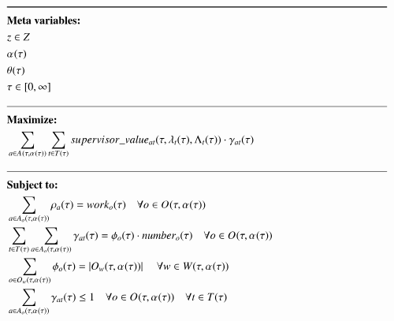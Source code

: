 \begin{alignat}{2}
	& \text{\rule{\linewidth}{0.8pt}} \notag \label{}                                                                                                                                                                                                                                                                                                                                                                     \\ 
	& \textbf{Meta variables:} \notag\\
	& \ElementSupervisor \in \SetSupervisor \\
	& \VarStrategicWorkOrderAssignment{}{} \\
	& \VarIncludeActivity{} \\
	& \tau \in [0, \infty] \\
	& \text{\rule{\linewidth}{0.4pt}} \notag\\
	& \textbf{Maximize:} \notag\\
	& \sum_{\ElementActivity \in \SetActivity{\VarStrategicWorkOrderAssignment{}{}}{}} \sum_{\ElementTechnician \in \SetTechnician} \ParSupervisorValue \cdot \VarSupervisorAssignment{\ElementActivity}{\ElementTechnician} \\ 
	& \text{\rule{\linewidth}{0.4pt}} \notag\\
	& \textbf{Subject to:} \notag\\ 
	& \sum_{\ElementActivity \in \SetActivity{\VarStrategicWorkOrderAssignment{}{}}{\ElementOperation}} \VarActivityWork{\ElementActivity} = \ParOperationWork{\ElementOperation}    \quad \forall \ElementOperation \in \SetOperation{}{\VarStrategicWorkOrderAssignment{}{}}\\
	& \sum_{\ElementTechnician \in \SetTechnician} \sum_{\ElementActivity \in \SetActivity{\VarStrategicWorkOrderAssignment{}{}}{\ElementOperation}}\VarSupervisorAssignment{\ElementActivity}{\ElementTechnician} = \VarSupervisorAssignmentWhole \cdot \ParNumberOfPeople  \quad \forall \ElementOperation \in \SetOperation{}{\VarStrategicWorkOrderAssignment{}{}}  \\
	& \sum_{\ElementOperation \in \SetOperation{\ElementWorkOrder}{\VarStrategicWorkOrderAssignment{}{}}} \VarSupervisorAssignmentWhole = |\SetOperation{\ElementWorkOrder}{\VarStrategicWorkOrderAssignment{}{}}| \ \quad \forall \ElementWorkOrder \in \SetWorkOrder{,\VarStrategicWorkOrderAssignment{}{}} \\
	& \sum_{\ElementActivity \in \SetActivity{\VarStrategicWorkOrderAssignment{}{}}{\ElementOperation}} \VarSupervisorAssignment{\ElementActivity}{\ElementTechnician} \leq 1  \quad \forall \ElementOperation \in \SetOperation{}{\VarStrategicWorkOrderAssignment{}{}} \quad \forall \ElementTechnician \in \SetTechnician \\  

\end{alignat}

